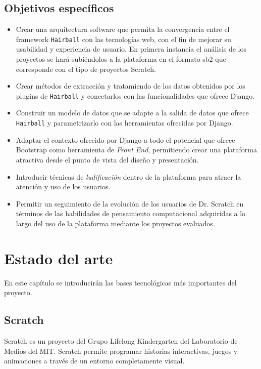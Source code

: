 \documentclass[a4paper, 12pt]{book}
\begin{document}
\section{Objetivos específicos}
\label{sec:objetivos-especificos}

\begin{itemize}
  \item Crear una arquitectura software que permita la convergencia entre el framework 
	\texttt{Hairball} con las tecnologías web, con el fin de mejorar su usabilidad y 
	experiencia de usuario. En 	primera instancia el análisis de los proyectos se hará 
	subiéndolos a la plataforma en el formato sb2 que corresponde con el tipo de
	proyectos Scratch.
	\item Crear métodos de extracción y tratamiendo de los datos obtenidos por los
	plugins de \texttt{Hairball} y conectarlos con las funcionalidades que ofrece
	Django.
  \item Construir un modelo de datos que se adapte a la salida de datos que ofrece 
	\texttt{Hairball} y parametrizarlo con las herramientas ofrecidas por Django.
  \item Adaptar el contexto ofrecido por Django a todo el potencial que ofrece Bootstrap 
	como herramienta de \emph{Front End}, permitiendo crear una plataforma atractiva 
	desde el punto de vista del diseño y presentación.
  \item Introducir técnicas de \emph{ludificación} dentro de la plataforma para atraer 
	la atención y uso de los usuarios.
	\item Permitir un seguimiento de la evolución de los usuarios de Dr. Scratch en 
	términos de las habilidades de pensamiento computacional adquiridas a lo largo del 
	uso de la plataforma mediante los proyectos evaluados.
\end{itemize}



\cleardoublepage
\chapter{Estado del arte}

En este capítulo se introducirán las bases tecnológicas más importantes del proyecto.


\section{Scratch}
\label{sec:seccion2}
Scratch es un proyecto del Grupo Lifelong Kindergarten del Laboratorio de Medios del MIT.
Scratch permite programar historias interactivas, juegos y animaciones a través de un
entorno completamente visual. \\
\end{document}
